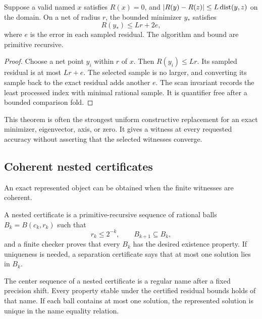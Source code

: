 \begin{theorem}
\label{thm:approx-witness}
Suppose a valid named \(x\) satisfies \(R(x)=0\), and
\(\left|R(y)-R(z)\right|\le L\operatorname{dist}(y,z)\) on the domain.  On a net of radius \(r\),
the bounded minimizer \(y_*\) satisfies
\[
 R(y_*)\le Lr+2e,
\]
where \(e\) is the error in each sampled residual.  The algorithm and bound
are primitive recursive.
\end{theorem}

\begin{proof}
Choose a net point \(y_i\) within \(r\) of \(x\).  Then
\(R(y_i)\le Lr\).  Its sampled residual is at most \(Lr+e\).  The selected
sample is no larger, and converting its sample back to the exact residual adds
another \(e\).  The scan invariant records the least processed index with
minimal rational sample.  It is quantifier free after a bounded comparison
fold.
\end{proof}

This theorem is often the strongest uniform constructive replacement for an
exact minimizer, eigenvector, axis, or zero.  It gives a witness at every
requested accuracy without asserting that the selected witnesses converge.

\subsection{Coherent nested certificates}

An exact represented object can be obtained when the finite witnesses are
coherent.

\begin{definition}
A nested certificate is a primitive-recursive sequence of rational balls
\(B_k=B(c_k,r_k)\) such that
\[
 r_k\le2^{-k},\qquad B_{k+1}\subseteq B_k,
\]
and a finite checker proves that every \(B_k\) has the desired existence
property.  If uniqueness is needed, a separation certificate says that at
most one solution lies in \(B_k\).
\end{definition}

\begin{theorem}
\label{thm:nested-name}
The center sequence of a nested certificate is a regular name after a fixed
precision shift.  Every property stable under the certified residual bounds
holds of that name.  If each ball contains at most one solution, the represented
solution is unique in the name equality relation.
\end{theorem}

